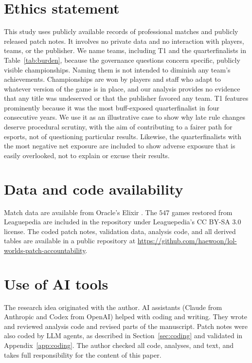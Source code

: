 \documentclass[11pt]{article}
\begin{document}
\section*{Ethics statement}
This study uses publicly available records of professional matches and publicly released patch notes. It involves no private data and no interaction with players, teams, or the publisher. We name teams, including T1 and the quarterfinalists in Table~\ref{tab:burden}, because the governance questions concern specific, publicly visible championships. Naming them is not intended to diminish any team's achievements. Championships are won by players and staff who adapt to whatever version of the game is in place, and our analysis provides no evidence that any title was undeserved or that the publisher favored any team. T1 features prominently because it was the most buff-exposed quarterfinalist in four consecutive years. We use it as an illustrative case to show why late rule changes deserve procedural scrutiny, with the aim of contributing to a fairer path for esports, not of questioning particular results. Likewise, the quarterfinalists with the most negative net exposure are included to show adverse exposure that is easily overlooked, not to explain or excuse their results.

\section*{Data and code availability}
Match data are available from Oracle's Elixir \citep{oracleselixir}. The $547$ games restored from Leaguepedia \citep{leaguepedia} are included in the repository under Leaguepedia's CC BY-SA 3.0 license. The coded patch notes, validation data, analysis code, and all derived tables are available in a public repository at \url{https://github.com/haewoon/lol-worlds-patch-accountability}.

\section*{Use of AI tools}
The research idea originated with the author. AI assistants (Claude from Anthropic and Codex from OpenAI) helped with coding and writing. They wrote and reviewed analysis code and revised parts of the manuscript. Patch notes were also coded by LLM agents, as described in Section~\ref{sec:coding} and validated in Appendix~\ref{app:coding}. The author checked all code, analyses, and text, and takes full responsibility for the content of this paper.
\end{document}
